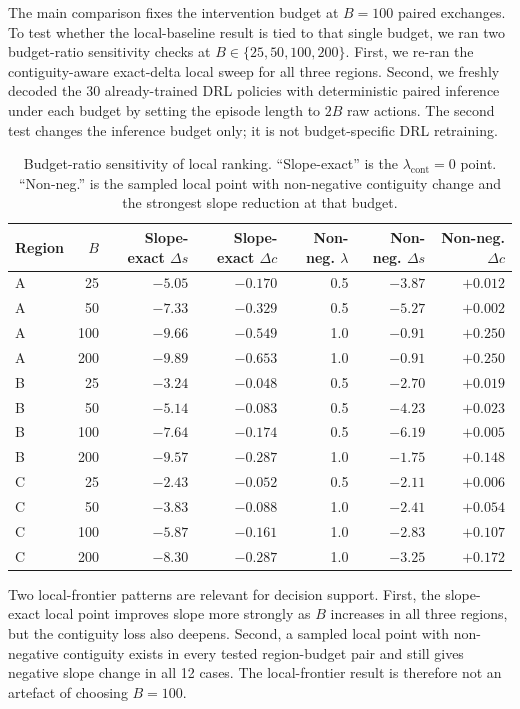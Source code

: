 \documentclass[]{interact}
\theoremstyle{plain}
\begin{document}
The main comparison fixes the intervention budget at $B=100$ paired exchanges. To test whether the local-baseline result is tied to that single budget, we ran two budget-ratio sensitivity checks at $B\in\{25,50,100,200\}$. First, we re-ran the contiguity-aware exact-delta local sweep for all three regions. Second, we freshly decoded the 30 already-trained DRL policies with deterministic paired inference under each budget by setting the episode length to $2B$ raw actions. The second test changes the inference budget only; it is not budget-specific DRL retraining.

\begin{table}[htbp]
\centering
\caption{Budget-ratio sensitivity of local ranking. ``Slope-exact'' is the $\lambda_{\mathrm{cont}}=0$ point. ``Non-neg.'' is the sampled local point with non-negative contiguity change and the strongest slope reduction at that budget.}
\label{tab:budget-sensitivity}
\scriptsize
\begin{tabular}{lrrrrrr}
\toprule
Region & $B$ & Slope-exact $\Delta s$ & Slope-exact $\Delta c$ & Non-neg. $\lambda$ & Non-neg. $\Delta s$ & Non-neg. $\Delta c$ \\
\midrule
A & 25  & $-5.05$ & $-0.170$ & 0.5 & $-3.87$ & $+0.012$ \\
A & 50  & $-7.33$ & $-0.329$ & 0.5 & $-5.27$ & $+0.002$ \\
A & 100 & $-9.66$ & $-0.549$ & 1.0 & $-0.91$ & $+0.250$ \\
A & 200 & $-9.89$ & $-0.653$ & 1.0 & $-0.91$ & $+0.250$ \\
\midrule
B & 25  & $-3.24$ & $-0.048$ & 0.5 & $-2.70$ & $+0.019$ \\
B & 50  & $-5.14$ & $-0.083$ & 0.5 & $-4.23$ & $+0.023$ \\
B & 100 & $-7.64$ & $-0.174$ & 0.5 & $-6.19$ & $+0.005$ \\
B & 200 & $-9.57$ & $-0.287$ & 1.0 & $-1.75$ & $+0.148$ \\
\midrule
C & 25  & $-2.43$ & $-0.052$ & 0.5 & $-2.11$ & $+0.006$ \\
C & 50  & $-3.83$ & $-0.088$ & 1.0 & $-2.41$ & $+0.054$ \\
C & 100 & $-5.87$ & $-0.161$ & 1.0 & $-2.83$ & $+0.107$ \\
C & 200 & $-8.30$ & $-0.287$ & 1.0 & $-3.25$ & $+0.172$ \\
\bottomrule
\end{tabular}
\end{table}

Two local-frontier patterns are relevant for decision support. First, the slope-exact local point improves slope more strongly as $B$ increases in all three regions, but the contiguity loss also deepens. Second, a sampled local point with non-negative contiguity exists in every tested region-budget pair and still gives negative slope change in all 12 cases. The local-frontier result is therefore not an artefact of choosing $B=100$.
\end{document}
